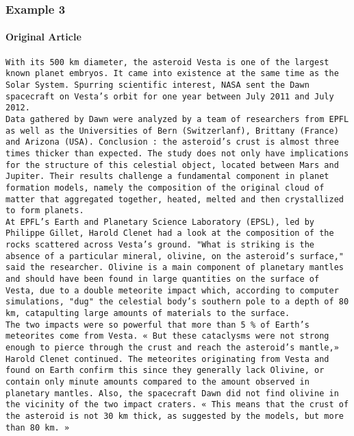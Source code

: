 \subsubsection{Example 3}
\paragraph{\colorbox{YellowOrange}{Original Article}}
\texttt{With its 500 km diameter, the asteroid Vesta is one of the largest known planet embryos. It came into existence at the same time as the Solar System. Spurring scientific interest, NASA sent the Dawn spacecraft on Vesta’s orbit for one year between July 2011 and July 2012. \\
Data gathered by Dawn were analyzed by a team of researchers from EPFL as well as the Universities of Bern (Switzerlanf), Brittany (France) and Arizona (USA). Conclusion : the asteroid's crust is almost three times thicker than expected. The study does not only have implications for the structure of this celestial object, located between Mars and Jupiter. Their results challenge a fundamental component in planet formation models, namely the composition of the original cloud of matter that aggregated together, heated, melted and then crystallized to form planets. \\
At EPFL’s Earth and Planetary Science Laboratory (EPSL), led by Philippe Gillet, Harold Clenet had a look at the composition of the rocks scattered across Vesta’s ground. "What is striking is the absence of a particular mineral, olivine, on the asteroid’s surface," said the researcher. Olivine is a main component of planetary mantles and should have been found in large quantities on the surface of Vesta, due to a double meteorite impact which, according to computer simulations, "dug" the celestial body’s southern pole to a depth of 80 km, catapulting large amounts of materials to the surface. \\
The two impacts were so powerful that more than 5 \% of Earth's meteorites come from Vesta. « But these cataclysms were not strong enough to pierce through the crust and reach the asteroid's mantle,» Harold Clenet continued. The meteorites originating from Vesta and found on Earth confirm this since they generally lack Olivine, or contain only minute amounts compared to the amount observed in planetary mantles. Also, the spacecraft Dawn did not find olivine in the vicinity of the two impact craters. « This means that the crust of the asteroid is not 30 km thick, as suggested by the models, but more than 80 km. » \\
}
